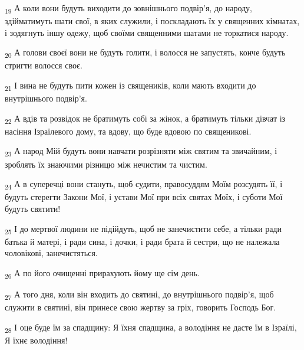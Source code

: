\begin{tcolorbox}
\textsubscript{19} А коли вони будуть виходити до зовнішнього подвір'я, до народу, здійматимуть шати свої, в яких служили, і поскладають їх у священних кімнатах, і зодягнуть іншу одежу, щоб своїми священними шатами не торкатися народу.
\end{tcolorbox}
\begin{tcolorbox}
\textsubscript{20} А голови своєї вони не будуть голити, і волосся не запустять, конче будуть стригти волосся своє.
\end{tcolorbox}
\begin{tcolorbox}
\textsubscript{21} І вина не будуть пити кожен із священиків, коли мають входити до внутрішнього подвір'я.
\end{tcolorbox}
\begin{tcolorbox}
\textsubscript{22} А вдів та розвідок не братимуть собі за жінок, а братимуть тільки дівчат із насіння Ізраїлевого дому, та вдову, що буде вдовою по священикові.
\end{tcolorbox}
\begin{tcolorbox}
\textsubscript{23} А народ Мій будуть вони навчати розрізняти між святим та звичайним, і зроблять їх знаючими різницю між нечистим та чистим.
\end{tcolorbox}
\begin{tcolorbox}
\textsubscript{24} А в суперечці вони стануть, щоб судити, правосуддям Моїм розсудять її, і будуть стерегти Закони Мої, і устави Мої при всіх святах Моїх, і суботи Мої будуть святити!
\end{tcolorbox}
\begin{tcolorbox}
\textsubscript{25} І до мертвої людини не підійдуть, щоб не занечистити себе, а тільки ради батька й матері, і ради сина, і дочки, і ради брата й сестри, що не належала чоловікові, занечистяться.
\end{tcolorbox}
\begin{tcolorbox}
\textsubscript{26} А по його очищенні прирахують йому ще сім день.
\end{tcolorbox}
\begin{tcolorbox}
\textsubscript{27} А того дня, коли він входить до святині, до внутрішнього подвір'я, щоб служити в святині, він принесе свою жертву за гріх, говорить Господь Бог.
\end{tcolorbox}
\begin{tcolorbox}
\textsubscript{28} І оце буде їм за спадщину: Я їхня спадщина, а володіння не дасте їм в Ізраїлі, Я їхнє володіння!
\end{tcolorbox}
